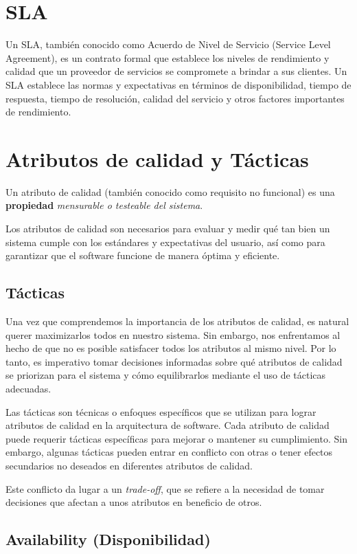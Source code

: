 \documentclass{article}
\begin{document}
		\section{SLA}\label{sec:sla}
		Un SLA, también conocido como Acuerdo de Nivel de Servicio (Service Level Agreement), es un contrato formal que establece los niveles de rendimiento y calidad que un proveedor de servicios se compromete a brindar a sus clientes. Un SLA establece las normas y expectativas en términos de disponibilidad, tiempo de respuesta, tiempo de resolución, calidad del servicio y otros factores importantes de rendimiento.
		
		
		\section{Atributos de calidad y Tácticas}
			Un atributo de calidad (también conocido como requisito no funcional) es una \textbf{propiedad} \textit{mensurable o testeable del sistema}.
			
			Los atributos de calidad son necesarios para evaluar y medir qué tan bien un sistema cumple con los estándares y expectativas del usuario, así como para garantizar que el software funcione de manera óptima y eficiente.

			
		\subsection{Tácticas}
			Una vez que comprendemos la importancia de los atributos de calidad, es natural querer maximizarlos todos en nuestro sistema. Sin embargo, nos enfrentamos al hecho de que no es posible satisfacer todos los atributos al mismo nivel. Por lo tanto, es imperativo tomar decisiones informadas sobre qué atributos de calidad se priorizan para el sistema y cómo equilibrarlos mediante el uso de tácticas adecuadas.
			
			Las tácticas son técnicas o enfoques específicos que se utilizan para lograr atributos de calidad en la arquitectura de software. Cada atributo de calidad puede requerir tácticas específicas para mejorar o mantener su cumplimiento. Sin embargo, algunas tácticas pueden entrar en conflicto con otras o tener efectos secundarios no deseados en diferentes atributos de calidad.
			
			Este conflicto da lugar a un \textit{trade-off}, que se refiere a la necesidad de tomar decisiones que afectan a unos atributos en beneficio de otros.

		
		\subsection{Availability \small{(Disponibilidad)}}
		
\end{document}
